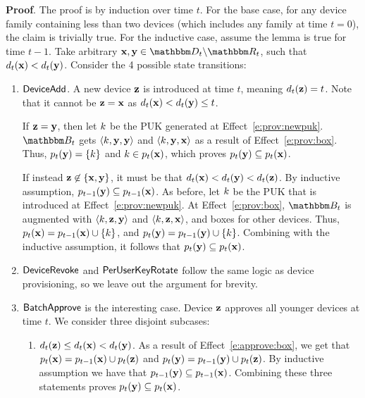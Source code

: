 \textbf{Proof}.
%
The proof is by induction over time $t$. For the base case, for any device family containing less
than two devices (which includes any family at time $t=0$), the claim is trivially true. For the
inductive case, assume the lemma is true for time $t-1$. Take arbitrary $\zdev{x},\zdev{y} \in
\zset{d}_t \setsub \zset{r}_t$, such that $d_t(\mathbf{x}) < d_t(\mathbf{y})$.  Consider
the 4 possible state transitions:
%
\begin{enumerate} 
\item $\mathsf{DeviceAdd}{}$. A new device $\mathbf{z}$ is introduced at time $t$, meaning
  $d_t(\mathbf{z}) = t$. Note that it cannot be $\mathbf{z} = \mathbf{x}$ as
  $d_t(\mathbf{x}) < d_t(\mathbf{y}) \leq t$.

  If $\mathbf{z} = \mathbf{y}$, then let ${k}$ be the PUK generated at Effect~\ref{e:prov:newpuk}.
  $\zset{B}_t$ gets $\langle {k}, \mathbf{y}, \mathbf{y} \rangle$ and $\langle {k}, \mathbf{y},
  \mathbf{x} \rangle$ as a result of Effect~\ref{e:prov:box}. Thus, $p_t(\mathbf{y}) = \left\{
  {k} \right\}$ and ${k} \in p_t(\mathbf{x})$, which proves $p_t(\mathbf{y})
  \subseteq p_t(\mathbf{x})$.

  If instead $\mathbf{z} \not\in \{\mathbf{x},\mathbf{y}\}$, it must be that $d_t(\mathbf{x}) <
  d_t(\mathbf{y}) < d_t(\mathbf{z})$. By inductive assumption, $p_{t-1}(\mathbf{y})
  \subseteq p_{t-1}(\mathbf{x})$. As before, let ${k}$ be the PUK that is introduced at
  Effect~\ref{e:prov:newpuk}. At Effect~\ref{e:prov:box}, $\zset{b}_t$ is augmented with $\langle
  {k}, \mathbf{z}, \mathbf{y} \rangle$ and $\langle {k}, \mathbf{z}, \mathbf{x} \rangle$, and
  boxes for other devices. Thus, $p_t(\mathbf{x}) = p_{t-1}(\mathbf{x}) \cup \left\{ k
  \right\}$, and $p_t(\mathbf{y}) = p_{t-1}(\mathbf{y}) \cup \left\{ k \right\}$. Combining
  with the inductive assumption, it follows that $p_t(\mathbf{y}) \subseteq p_t(\mathbf{x})$.

\item $\mathsf{DeviceRevoke}{}$ and $\mathsf{PerUserKeyRotate}{}$ follow the same logic as device provisioning, so
  we leave out the argument for brevity.

\item $\mathsf{BatchApprove}{}$ is the interesting case. Device $\mathbf{z}$ approves all younger devices at
  time $t$. We consider three disjoint subcases:
  \begin{enumerate}
  \item $d_t(\mathbf{z}) \leq d_t(\mathbf{x}) < d_t(\mathbf{y})$. As a result of
    Effect~\ref{e:approve:box}, we get that $p_t(\mathbf{x}) = p_{t-1}(\mathbf{x}) \cup
    p_t(\mathbf{z})$ and $p_t(\mathbf{y}) = p_{t-1}(\mathbf{y}) \cup p_t(\mathbf{z})$.
    By inductive assumption we have that $p_{t-1}(\mathbf{y}) \subseteq p_{t-1}(\mathbf{x})$.
    Combining these three statements proves $p_t(\mathbf{y}) \subseteq p_t(\mathbf{x})$.


\end{enumerate}
\end{enumerate}
